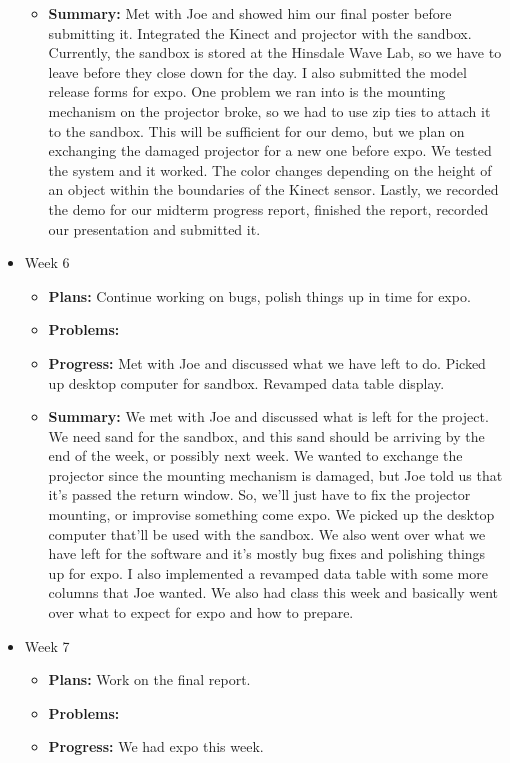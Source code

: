 \documentclass[onecolumn, draftclsnofoot,10pt, compsoc]{IEEEtran}
\begin{document}
\begin{itemize}
\begin{itemize}
    \item \textbf{Summary:} Met with Joe and showed him our final poster before submitting it. Integrated the Kinect and projector with the sandbox. Currently, the sandbox is stored at the Hinsdale Wave Lab, so we have to leave before they close down for the day. I also submitted the model release forms for expo. One problem we ran into is the mounting mechanism on the projector broke, so we had to use zip ties to attach it to the sandbox. This will be sufficient for our demo, but we plan on exchanging the damaged projector for a new one before expo. We tested the system and it worked. The color changes depending on the height of an object within the boundaries of the Kinect sensor. Lastly, we recorded the demo for our midterm progress report, finished the report, recorded our presentation and submitted it.
	\end{itemize}
\item Week 6
	\begin{itemize}
	\item \textbf{Plans:} Continue working on bugs, polish things up in time for expo.
    \item \textbf{Problems:} 
    \item \textbf{Progress:} Met with Joe and discussed what we have left to do. Picked up desktop computer for sandbox. Revamped data table display.
    \item \textbf{Summary:} We met with Joe and discussed what is left for the project. We need sand for the sandbox, and this sand should be arriving by the end of the week, or possibly next week. We wanted to exchange the projector since the mounting mechanism is damaged, but Joe told us that it's passed the return window. So, we'll just have to fix the projector mounting, or improvise something come expo. We picked up the desktop computer that'll be used with the sandbox. We also went over what we have left for the software and it's mostly bug fixes and polishing things up for expo. I also implemented a revamped data table with some more columns that Joe wanted. We also had class this week and basically went over what to expect for expo and how to prepare.
	\end{itemize}
\item Week 7
	\begin{itemize}
	\item \textbf{Plans:} Work on the final report.
    \item \textbf{Problems:} 
    \item \textbf{Progress:} We had expo this week.

\end{itemize}
\end{itemize}
\end{document}
